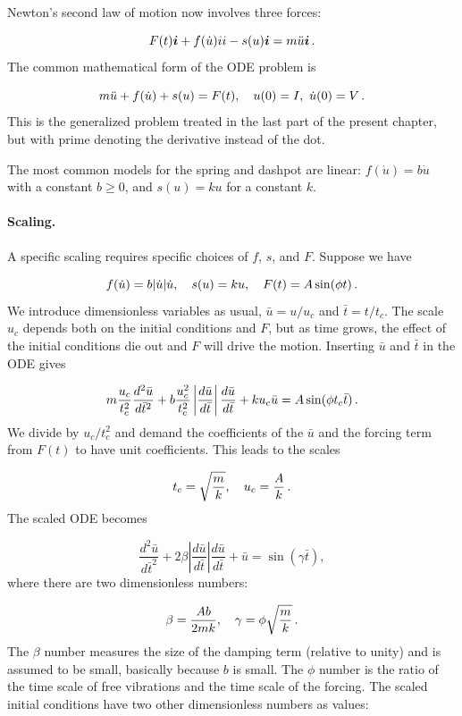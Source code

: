 \documentclass[%
oneside,                 %
final,                   %
10pt]{article}
\begin{document}
Newton's second law of motion now involves three forces:

\[ F(t)\ii + f(\dot u)ii - s(u)\ii = m\ddot u \ii\tp\]
The common mathematical form of the ODE problem is

\begin{equation}
m\ddot u + f(\dot u) + s(u) = F(t),\quad u(0)=I,\ \dot u(0)=V\tp
\label{vib:app:mass_gen:equ}
\end{equation}
This is the generalized problem treated in the last part of the
present chapter, but with prime denoting the derivative instead of the dot.

The most common models for the spring and dashpot are linear: $f(\dot u)
=b\dot u$ with a constant $b\geq 0$, and $s(u)=ku$ for a constant $k$.

\paragraph{Scaling.}
A specific scaling requires specific choices of $f$, $s$, and $F$.
Suppose we have

\[ f(\dot u) = b|\dot u|\dot u,\quad s(u)=ku,\quad F(t)=A\sin(\phi t)\tp\]
We introduce dimensionless variables as usual, $\bar u = u/u_c$ and
$\bar t = t/t_c$. The scale $u_c$ depends both on the initial conditions
and $F$, but as time grows, the effect of the initial conditions die out
and $F$ will drive the motion. Inserting $\bar u$ and $\bar t$ in the
ODE gives

\[ m\frac{u_c}{t_c^2}\frac{d^2\bar u}{d\bar t^2}
+ b\frac{u_c^2}{t_c^2}\left\vert\frac{d\bar u}{d\bar t}\right\vert
\frac{d\bar u}{d\bar t} + ku_c\bar u = A\sin(\phi t_c\bar t)\tp\]
We divide by $u_c/t_c^2$ and demand the coefficients of the
$\bar u$ and the forcing term from $F(t)$ to have unit coefficients.
This leads to the scales

\[ t_c = \sqrt{\frac{m}{k}},\quad u_c = \frac{A}{k}\tp\]
The scaled ODE becomes

\begin{equation}
\frac{d^2\bar u}{d\bar t^2}
+ 2\beta\left\vert\frac{d\bar u}{d\bar t}\right\vert
\frac{d\bar u}{d\bar t} + \bar u = \sin(\gamma\bar t),
\label{vib:app:mass_gen:scaled}
\end{equation}
where there are two dimensionless numbers:

\[ \beta = \frac{Ab}{2mk},\quad\gamma =\phi\sqrt{\frac{m}{k}}\tp\]
The $\beta$ number measures the size of the damping term (relative to unity)
and is assumed to be small, basically because $b$ is small. The $\phi$
number is the ratio of the time scale of free vibrations and the time scale
of the forcing.
The scaled initial conditions have two other dimensionless numbers
as values:
\end{document}
